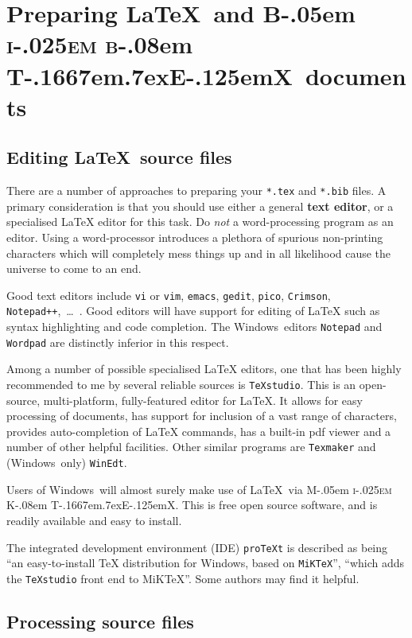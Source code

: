 \documentclass[times, doublespace]{anzsauth}
\newcommand\BibTeX{{\rmfamily B\kern-.05em \textsc{i\kern-.025em b}\kern-.08em
T\kern-.1667em\lower.7ex\hbox{E}\kern-.125emX}}
\newcommand\MiKTeX{{\rmfamily M\kern-.05em \textsc{i\kern-.025em K}\kern-.08em
T\kern-.1667em\lower.7ex\hbox{E}\kern-.125emX}}
\begin{document}
\section{Preparing \LaTeX\ and \BibTeX\ documents}
\label{sec:prepDocs}

\subsection{Editing \LaTeX\ source files}
\label{sec:editors}

There are a number of approaches to preparing your \texttt{*.tex}
and \texttt{*.bib} files. A primary consideration is that you should
use either a general \textbf{text editor}, or a specialised \LaTeX{}
editor for this task.  Do \emph{not} a word-processing program as
an editor. Using a word-processor introduces a plethora of spurious
non-printing characters which will completely mess things up and
in all likelihood cause the universe to come to an end.

Good text editors include \texttt{vi} or \texttt{vim},
\texttt{emacs}, \texttt{gedit}, \texttt{pico}, \texttt{Crimson},
\texttt{Notepad++},~\ldots\ .  Good editors will have support
for editing of \LaTeX{} such as syntax highlighting and code
completion. The Windows\texttrademark\ editors \texttt{Notepad}
and \texttt{Wordpad} are distinctly inferior in this respect.

Among a number of possible specialised \LaTeX{} editors, one that
has been highly recommended to me by several reliable sources
is \texttt{TeXstudio}. This is an open-source, multi-platform,
fully-featured editor for \LaTeX{}. It allows for easy processing of
documents, has support for inclusion of a vast range of characters,
provides auto-completion of \LaTeX{} commands, has a built-in pdf
viewer and a number of other helpful facilities. Other similar
programs are \texttt{Texmaker} and (Windows\texttrademark\ only)
\texttt{WinEdt}.

Users of Windows\texttrademark\ will almost surely make use of
\LaTeX\ via \MiKTeX.  This is free open source software, and is
readily available and easy to install.

The integrated development environment (IDE) \texttt{proTeXt} is
described as being ``an easy-to-install \TeX{} distribution for
Windows\texttrademark, based on \texttt{MiKTeX}'', ``which adds
the \texttt{TeXstudio} front end to MiKTeX''.  Some authors may
find it helpful.

\subsection{Processing source files}
\label{sec:procBib}
\end{document}

